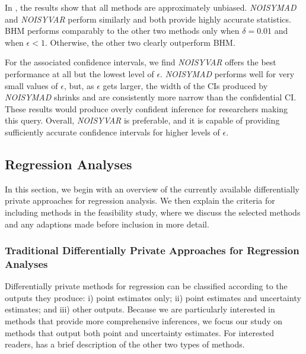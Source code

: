 In \cite{barrientos2021}, the results show that all methods are approximately unbiased. \textit{NOISYMAD} and \textit{NOISYVAR} perform similarly and both provide highly accurate statistics. BHM performs comparably to the other two methods only when $\delta = 0.01$ and when $\epsilon < 1$. Otherwise, the other two clearly outperform BHM.

For the associated confidence intervals, we find \textit{NOISYVAR} offers the best performance at all but the lowest level of $\epsilon$. \textit{NOISYMAD} performs well for very small values of $\epsilon$, but, as $\epsilon$ gets larger, the width of the CIs produced by \textit{NOISYMAD} shrinks and are consistently more narrow than the confidential CI. These results would produce overly confident inference for researchers making this query. Overall, \textit{NOISYVAR} is preferable, and it is capable of providing sufficiently accurate confidence intervals for higher levels of $\epsilon$.

\subsection{Regression Analyses}
In this section, we begin with an overview of the currently available differentially private approaches for regression analysis. We then explain the criteria for including methods in the feasibility study, where we discuss the selected methods and any adaptions made before inclusion in more detail.

\subsubsection{Traditional Differentially Private Approaches for Regression Analyses}\label{subsubsec:reg_rev}

Differentially private methods for regression can be classified according to the outputs they produce: i) point estimates only; ii) point estimates and uncertainty estimates; and  iii) other outputs. Because we are particularly interested in methods that provide more comprehensive inferences, we focus our study on methods that output both point and uncertainty estimates. For interested readers, \cite{barrientos2021} has a brief description of the other two types of methods.

